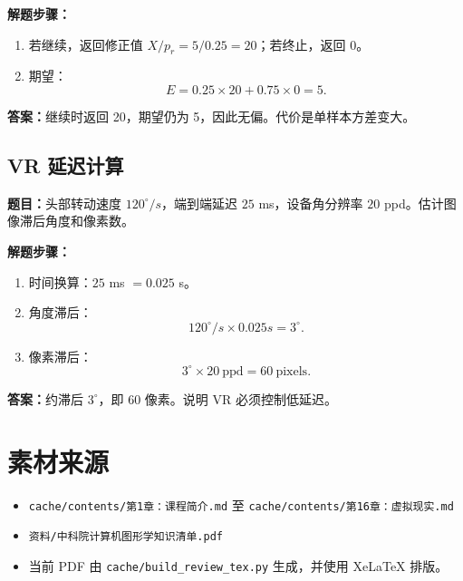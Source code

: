 \documentclass[UTF8,zihao=-4,scheme=chinese,fontset=fandol]{ctexart}
\begin{document}
\textbf{解题步骤：}
\begin{enumerate}
  \item 若继续，返回修正值 $X/p_r=5/0.25=20$；若终止，返回 0。
  \item 期望：
  \[
  E=0.25\times20+0.75\times0=5.
  \]
\end{enumerate}
\textbf{答案：}继续时返回 20，期望仍为 5，因此无偏。代价是单样本方差变大。

\subsection{VR 延迟计算}
\textbf{题目：}头部转动速度 $120^\circ/s$，端到端延迟 $25$ ms，设备角分辨率 $20$ ppd。估计图像滞后角度和像素数。

\textbf{解题步骤：}
\begin{enumerate}
  \item 时间换算：$25$ ms $=0.025$ s。
  \item 角度滞后：
  \[
  120^\circ/s\times0.025s=3^\circ.
  \]
  \item 像素滞后：
  \[
  3^\circ\times20\ \mathrm{ppd}=60\ \mathrm{pixels}.
  \]
\end{enumerate}
\textbf{答案：}约滞后 $3^\circ$，即 60 像素。说明 VR 必须控制低延迟。

\section*{素材来源}
\begin{itemize}
  \item \texttt{cache/contents/第1章：课程简介.md} 至 \texttt{cache/contents/第16章：虚拟现实.md}
  \item \texttt{资料/中科院计算机图形学知识清单.pdf}
  \item 当前 PDF 由 \texttt{cache/build\_review\_tex.py} 生成，并使用 XeLaTeX 排版。
\end{itemize}
\end{document}
